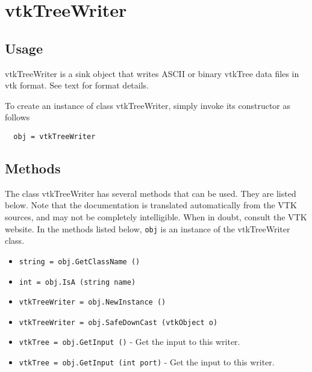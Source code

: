 \section{vtkTreeWriter}

\subsection{Usage}

 vtkTreeWriter is a sink object that writes ASCII or binary 
 vtkTree data files in vtk format. See text for format details.

To create an instance of class vtkTreeWriter, simply
invoke its constructor as follows
\begin{verbatim}
  obj = vtkTreeWriter
\end{verbatim}
\subsection{Methods}

The class vtkTreeWriter has several methods that can be used.
  They are listed below.
Note that the documentation is translated automatically from the VTK sources,
and may not be completely intelligible.  When in doubt, consult the VTK website.
In the methods listed below, \verb|obj| is an instance of the vtkTreeWriter class.
\begin{itemize}
\item  \verb|string = obj.GetClassName ()|

\item  \verb|int = obj.IsA (string name)|

\item  \verb|vtkTreeWriter = obj.NewInstance ()|

\item  \verb|vtkTreeWriter = obj.SafeDownCast (vtkObject o)|

\item  \verb|vtkTree = obj.GetInput ()| -  Get the input to this writer.

\item  \verb|vtkTree = obj.GetInput (int port)| -  Get the input to this writer.

\end{itemize}
